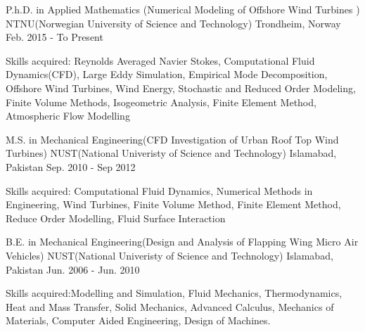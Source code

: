 

\begin{cventries}
	\cventry
	{P.h.D. in Applied Mathematics (Numerical Modeling of Offshore Wind Turbines )} %
	{NTNU(Norwegian University of Science and Technology)} %
	{Trondheim, Norway} %
	{Feb. 2015 - To Present} %
	{
		\begin{cvitems} %
			\item {Skills acquired: Reynolds Averaged Navier Stokes, Computational Fluid Dynamics(CFD), Large Eddy Simulation, Empirical Mode Decomposition, Offshore Wind Turbines, Wind Energy, Stochastic and Reduced Order Modeling, Finite Volume Methods, Isogeometric Analysis, Finite Element Method, Atmospheric Flow Modelling}
		\end{cvitems}
	}
\end{cventries}
\begin{cventries}
  \cventry
    {M.S. in Mechanical Engineering(CFD Investigation of Urban Roof Top Wind Turbines)} %
    {NUST(National Univeristy of Science and Technology)} %
    {Islamabad, Pakistan} %
    {Sep. 2010 - Sep 2012} %
    {
      \begin{cvitems} %
        \item {Skills acquired: Computational Fluid Dynamics, Numerical Methods in Engineering, Wind Turbines, Finite Volume Method, Finite Element Method, Reduce Order Modelling, Fluid Surface Interaction }
      \end{cvitems}
    }

\end{cventries}
\begin{cventries}
	\cventry
	{B.E. in Mechanical Engineering(Design and Analysis of Flapping Wing Micro Air Vehicles)} %
	{NUST(National Univeristy of Science and Technology)} %
	{Islamabad, Pakistan} %
	{Jun. 2006 - Jun. 2010} %
	{
		\begin{cvitems} %
			\item {Skills acquired:Modelling and Simulation, Fluid Mechanics, Thermodynamics, Heat and Mass Transfer, Solid Mechanics, Advanced Calculus, Mechanics of Materials, Computer Aided Engineering, Design of Machines.}
		\end{cvitems}
	}
\end{cventries}
